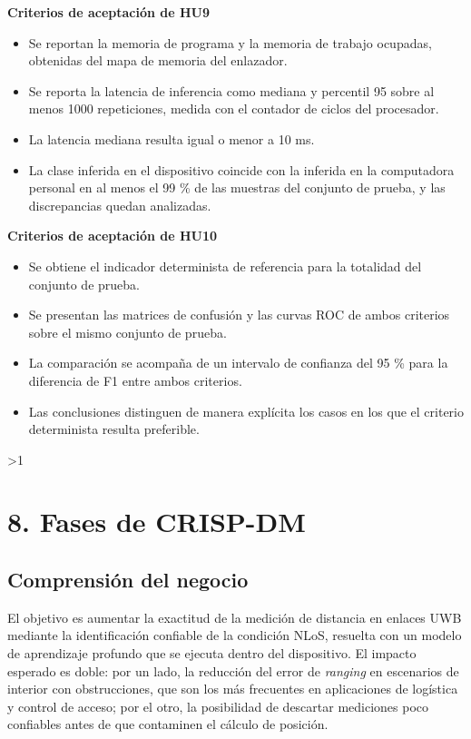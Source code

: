 \documentclass[
11pt, %
]{charter}
\providecommand{\revision}{1}
\begin{document}
\textbf{Criterios de aceptación de HU9}
\begin{itemize}
    \item Se reportan la memoria de programa y la memoria de trabajo ocupadas, obtenidas del mapa de memoria del enlazador.
    \item Se reporta la latencia de inferencia como mediana y percentil 95 sobre al menos 1000 repeticiones, medida con el contador de ciclos del procesador.
    \item La latencia mediana resulta igual o menor a 10 ms.
    \item La clase inferida en el dispositivo coincide con la inferida en la computadora personal en al menos el 99 \% de las muestras del conjunto de prueba, y las discrepancias quedan analizadas.
\end{itemize}

\textbf{Criterios de aceptación de HU10}
\begin{itemize}
    \item Se obtiene el indicador determinista de referencia para la totalidad del conjunto de prueba.
    \item Se presentan las matrices de confusión y las curvas ROC de ambos criterios sobre el mismo conjunto de prueba.
    \item La comparación se acompaña de un intervalo de confianza del 95 \% para la diferencia de F1 entre ambos criterios.
    \item Las conclusiones distinguen de manera explícita los casos en los que el criterio determinista resulta preferible.
\end{itemize}
\else\fi

\ifnum\revision>1
\section{8. Fases de CRISP-DM}
\label{sec:crispdm}

\subsection{Comprensión del negocio}

El objetivo es aumentar la exactitud de la medición de distancia en enlaces UWB mediante la identificación confiable de la condición NLoS, resuelta con un modelo de aprendizaje profundo que se ejecuta dentro del dispositivo. El impacto esperado es doble: por un lado, la reducción del error de \textit{ranging} en escenarios de interior con obstrucciones, que son los más frecuentes en aplicaciones de logística y control de acceso; por el otro, la posibilidad de descartar mediciones poco confiables antes de que contaminen el cálculo de posición.
\end{document}
